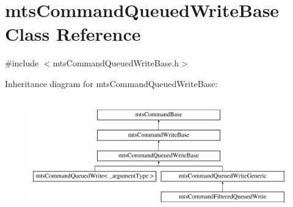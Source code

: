 \hypertarget{classmts_command_queued_write_base}{}\section{mts\+Command\+Queued\+Write\+Base Class Reference}
\label{classmts_command_queued_write_base}


{\ttfamily \#include $<$mts\+Command\+Queued\+Write\+Base.\+h$>$}

Inheritance diagram for mts\+Command\+Queued\+Write\+Base\+:\begin{figure}[H]
\begin{center}
\leavevmode
\includegraphics[height=5.000000cm]{d9/d66/classmts_command_queued_write_base}
\end{center}
\end{figure}
